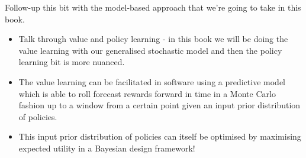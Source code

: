Follow-up this bit with the model-based approach that we're going to take in this book.
\begin{itemize}
\item{Talk through value and policy learning - in this book we will be doing the value learning with our generalised stochastic model and then the policy learning bit is more nuanced.}
\item{The value learning can be facilitated in software using a predictive model which is able to roll forecast rewards forward in time in a Monte Carlo fashion up to a window from a certain point given an input prior distribution of policies.}
\item{This input prior distribution of policies can itself be optimised by maximising expected utility in a Bayesian design framework!}
\end{itemize}
